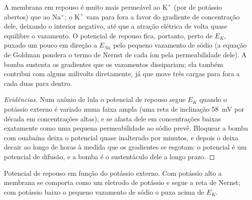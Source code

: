 \begin{proposition}\label{prop:b1:membranes-transport:resting}
A membrana em repouso é muito mais permeável ao $\mathrm{K^+}$ (por
 de potássio abertos) que ao $\mathrm{Na^+}$; o $\mathrm{K^+}$
vaza para fora a favor do gradiente de concentração dele, deixando o
interior negativo, até que a atração elétrica de volta quase equilibre o
vazamento. O potencial de repouso fica, portanto, perto de $E_K$,
puxado um pouco em direção a $E_{Na}$ pelo pequeno vazamento de sódio (a
equação de Goldman pondera o termo de Nernst de cada íon pela
permeabilidade dele). A bomba sustenta os gradientes que os vazamentos
dissipariam; ela também contribui com alguns milivolts diretamente, já
que move três cargas para fora a cada duas para dentro.
\end{proposition}
\begin{proof}[Evidências]
Num axônio de lula o potencial de repouso segue $E_K$ quando o potássio
externo é variado numa faixa ampla (uma reta de inclinação
\qty{58}{mV} por década em concentrações altas), e se afasta dele em
concentrações baixas exatamente como uma pequena permeabilidade ao sódio
prevê. Bloquear a bomba com ouabaína deixa o potencial quase inalterado
por minutos, e depois o deixa decair ao longo de horas à medida que os
gradientes se esgotam: o potencial é um potencial de difusão, e a bomba
é o sustentáculo dele a longo prazo.
\end{proof}

\begin{omfigure}

{\small Potencial de repouso em função do potássio externo. Com potássio
alto a membrana se comporta como um eletrodo de potássio e segue a reta
de Nernst; com potássio baixo o pequeno vazamento de sódio o puxa acima
de $E_K$.}
\end{omfigure}

